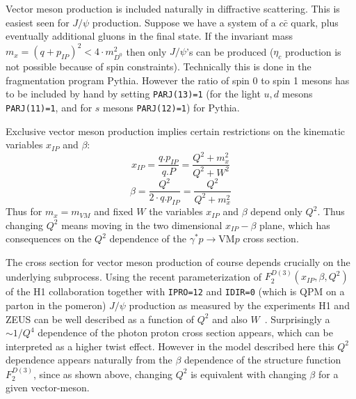 \documentclass[10pt]{article} \usepackage{dina4}
\newcommand{\pom}{I\!\!P}
\newcommand{\xpom}{x_{\pom}}
\def\PYTHIA{{\sc Pythia}}
\begin{document}
Vector meson production is included naturally in diffractive scattering.
This is easiest seen for $J/\psi$ production. Suppose we have a system of
a $c \bar{c}$ quark, plus eventually additional gluons in the final state.
If the invariant mass $m_x=(q + p_{\pom})^2 < 4 \cdot m^2_{D^0}$ 
then only $J/\psi$'s can be produced ($\eta_c$ production is not possible
because of spin constraints). 
Technically this is done  in the fragmentation
program \PYTHIA \cite{Jetseta,Jetsetb,Jetsetc}. 
However the ratio of 
spin 0 to spin 1 mesons has to be included by hand by 
setting \verb+PARJ(13)=1+
(for the light $u,d$ mesons \verb+PARJ(11)=1+, and for $s$ mesons 
\verb+PARJ(12)=1+) for  \PYTHIA. 
\par
Exclusive vector meson production implies certain restrictions on the
kinematic variables $\xpom$ and $\beta$:
$$
\xpom = \frac{q.p_{\pom}}{q.P}=
        \frac{Q^2 + m_x ^2}{Q^2 + W^2} $$
$$
\beta = \frac{Q^2}{2\cdot q.p_{\pom}} =
        \frac{Q^2}{Q^2 + m_x^2} $$
Thus for $m_x=m_{VM}$ and  fixed $W$ 
the variables $\xpom$ and $\beta$ depend only
$Q^2$. Thus changing $Q^2$ means moving in the two dimensional
$\xpom - \beta$ plane, which has consequences on the $Q^2$ dependence
of the $\gamma ^* p \rightarrow \mbox{VM} p$ cross section.
\par
The cross section for vector meson production of course depends 
crucially  on the underlying subprocess. Using the recent parameterization
of $F_2^{D(3)}(\xpom,\beta,Q^2)$ of the H1 collaboration \cite{H1_F2D3_97}
together with \verb+IPRO=12+ and \verb+IDIR=0+ (which is QPM on a
parton in the pomeron) $J/\psi$ production as measured by the experiments
H1 and ZEUS \cite{Jpsi_H1_dis,Jpsi_ZEUS} 
can be well described as a function of $Q^2$ and also 
$W$~\cite{Jung_Eilat}. 
Surprisingly a $\sim 1/Q^4$ dependence of the photon proton cross section
appears, which can be interpreted as a higher twist effect.  However in 
the model described here this $Q^2$ dependence appears naturally from
the $\beta$ dependence of the structure function $F_2^{D(3)}$, since as 
shown above, changing $Q^2$ is equivalent with changing $\beta$ for 
a given vector-meson.





\end{document}
